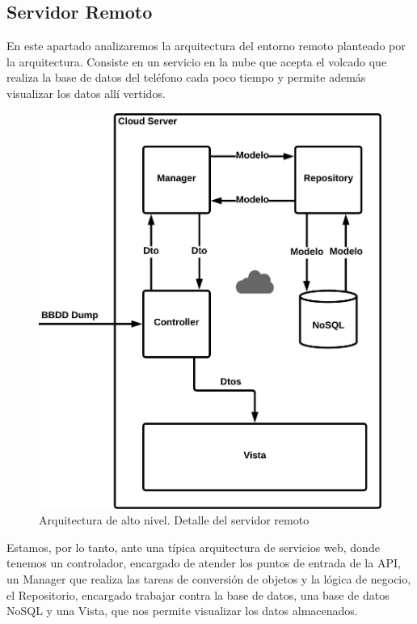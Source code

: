 \documentclass[12pt,a4paper,oneside]{book} %
\begin{document}
\subsection{Servidor Remoto}
En este apartado analizaremos la arquitectura del entorno remoto planteado por la arquitectura. Consiste en un servicio en la nube que acepta el volcado que realiza la base de datos del teléfono cada poco tiempo y permite además visualizar los datos allí vertidos. 
\begin{figure}[H]
  \begin{center}
     \includegraphics[scale=0.8]{pictures/architecture/highLevelArch03.png}
  \end{center}
  \caption[Arquitectura de alto nivel. Servidor remoto]{Arquitectura de alto nivel. Detalle del servidor remoto}
\end{figure}
Estamos, por lo tanto, ante una típica arquitectura de servicios web, donde tenemos un controlador, encargado de atender los puntos de entrada de la API, un Manager que realiza las tareas de conversión de objetos y la lógica de negocio, el Repositorio, encargado trabajar contra la base de datos, una base de datos NoSQL y una Vista, 	que nos permite visualizar los datos almacenados. 
\end{document}
